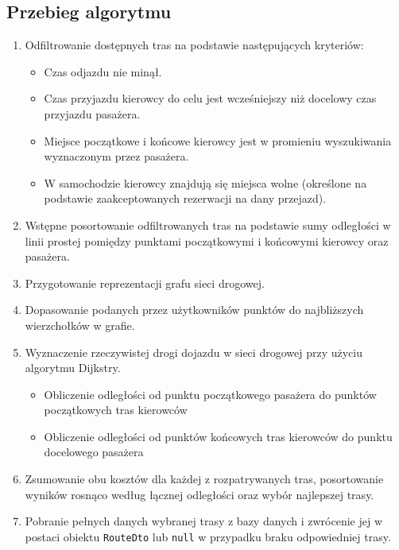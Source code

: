 \subsection{Przebieg algorytmu}
\begin{enumerate}
    \item Odfiltrowanie dostępnych tras na podstawie następujących kryteriów:
    \begin{itemize}
        \item Czas odjazdu nie minął.
        \item Czas przyjazdu kierowcy do celu jest wcześniejszy niż docelowy czas przyjazdu pasażera.
        \item Miejsce początkowe i końcowe kierowcy jest w promieniu wyszukiwania wyznaczonym przez pasażera.
        \item W samochodzie kierowcy znajdują się miejsca wolne (określone na podstawie zaakceptowanych rezerwacji na dany przejazd).
    \end{itemize}
    \item Wstępne posortowanie odfiltrowanych tras na podstawie sumy odległości w linii prostej pomiędzy punktami początkowymi i końcowymi kierowcy oraz pasażera.
    \item Przygotowanie reprezentacji grafu sieci drogowej.
    \item Dopasowanie podanych przez użytkowników punktów do najbliższych wierzchołków w grafie.
    \item Wyznaczenie rzeczywistej drogi dojazdu w sieci drogowej przy użyciu algorytmu Dijkstry.
    \begin{itemize}
        \item Obliczenie odległości od punktu początkowego pasażera do punktów początkowych tras kierowców
        \item Obliczenie odległości od punktów końcowych tras kierowców do punktu docelowego pasażera
    \end{itemize}
    \item Zsumowanie obu kosztów dla każdej z rozpatrywanych tras, posortowanie wyników rosnąco według łącznej odległości oraz wybór najlepszej trasy.
    \item Pobranie pełnych danych wybranej trasy z bazy danych i zwrócenie jej w postaci obiektu \texttt{RouteDto} lub \texttt{null} w przypadku braku odpowiedniej trasy.
\end{enumerate}
